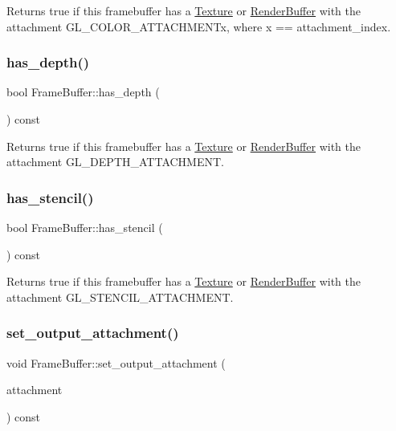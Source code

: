 Returns true if this framebuffer has a \mbox{\hyperlink{class_texture}{Texture}} or \mbox{\hyperlink{class_render_buffer}{Render\+Buffer}} with the attachment G\+L\+\_\+\+C\+O\+L\+O\+R\+\_\+\+A\+T\+T\+A\+C\+H\+M\+E\+N\+Tx, where x == attachment\+\_\+index. \mbox{\label{class_frame_buffer_a18d5cd8d11602cdf92e5f657b2879dbd}} 
\subsubsection{\texorpdfstring{has\+\_\+depth()}{has\_depth()}}
{\footnotesize\ttfamily bool Frame\+Buffer\+::has\+\_\+depth (\begin{DoxyParamCaption}{ }\end{DoxyParamCaption}) const}

Returns true if this framebuffer has a \mbox{\hyperlink{class_texture}{Texture}} or \mbox{\hyperlink{class_render_buffer}{Render\+Buffer}} with the attachment G\+L\+\_\+\+D\+E\+P\+T\+H\+\_\+\+A\+T\+T\+A\+C\+H\+M\+E\+NT. \mbox{\label{class_frame_buffer_a335d07f9693a899614ea9349d23b7b0b}} 
\subsubsection{\texorpdfstring{has\+\_\+stencil()}{has\_stencil()}}
{\footnotesize\ttfamily bool Frame\+Buffer\+::has\+\_\+stencil (\begin{DoxyParamCaption}{ }\end{DoxyParamCaption}) const}

Returns true if this framebuffer has a \mbox{\hyperlink{class_texture}{Texture}} or \mbox{\hyperlink{class_render_buffer}{Render\+Buffer}} with the attachment G\+L\+\_\+\+S\+T\+E\+N\+C\+I\+L\+\_\+\+A\+T\+T\+A\+C\+H\+M\+E\+NT. \mbox{\label{class_frame_buffer_a154cadd117fe1a33a131308524394706}} 
\subsubsection{\texorpdfstring{set\+\_\+output\+\_\+attachment()}{set\_output\_attachment()}}
{\footnotesize\ttfamily void Frame\+Buffer\+::set\+\_\+output\+\_\+attachment (\begin{DoxyParamCaption}\item[{G\+Lenum}]{attachment }\end{DoxyParamCaption}) const}

